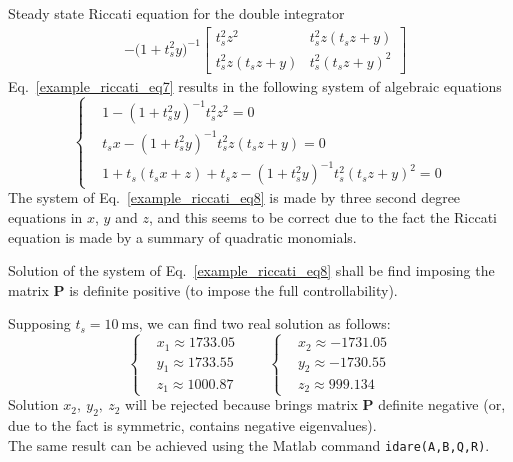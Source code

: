 \documentclass[12pt,a4paper,oneside]{book}
\begin{document}
\begin{onehalfspace}
\begin{example}{Steady state Riccati equation for the double integrator}
\begin{equation}
\begin{aligned}
		&-\Big(1+t_s^2y\Big)^{-1}\begin{bmatrix}t_s^2z^2 & t_s^2z(t_sz+y) \\ t_s^2z(t_sz+y) & t_s^2(t_sz+y)^2\end{bmatrix}
	\end{aligned}
\end{equation}
Eq.~\eqref{example_riccati_eq7} results in the following system of algebraic equations
\begin{equation}\label{example_riccati_eq8}
	\left\lbrace \begin{aligned}
		&	1 - (1+t_s^2y)^{-1}t_s^2z^2=0 \\[6pt]
		&	t_sx - (1+t_s^2y)^{-1}t_s^2z(t_sz+y) = 0 \\[6pt]
		&	1 + t_s(t_sx+z)+t_sz- (1+t_s^2y)^{-1}t_s^2(t_sz+y)^2=0
	\end{aligned}\right. 
\end{equation}
The system of Eq.~\eqref{example_riccati_eq8} is made by three second degree equations in 
$x$, $y$ and $z$, and this seems to be correct due to the fact the Riccati 
equation is made by a summary of quadratic monomials. 

Solution of the system of Eq.~\eqref{example_riccati_eq8} shall be find imposing the 
matrix $\mathbf{P}$ is definite positive (to impose the full controllability). 

Supposing $t_s=\SI{10}{\milli\second}$, we can find two real solution as 
follows:
\begin{equation}\label{riccati_7}
	\left\lbrace \begin{aligned}
		&	x_1 \approx 1733.05 \\[6pt]
		&	y_1 \approx 1733.55 \\[6pt]
		&	z_1 \approx 1000.87
	\end{aligned}\right. \qquad
	\left\lbrace \begin{aligned}
		&	x_2 \approx -1731.05 \\[6pt]
		&	y_2 \approx -1730.55 \\[6pt]
		&	z_2 \approx 999.134
	\end{aligned}\right. 
\end{equation}
Solution $x_2,\ y_2,\ z_2$ will be rejected because brings matrix $\mathbf{P}$ 
definite negative (or, due to the fact is symmetric, contains negative 
eigenvalues). \\

The same result can be achieved using the Matlab command 
\texttt{idare(A,B,Q,R)}.


\end{example}
\end{onehalfspace}
\end{document}
